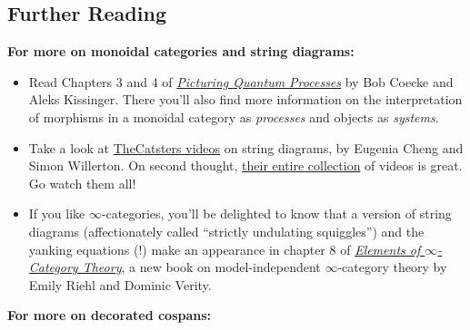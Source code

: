 \documentclass{tufte-handout-tai}
\theoremstyle{plain}
\theoremstyle{definition}
\theoremstyle{remark}
\begin{document}
\subsection{Further Reading}
\textbf{For more on monoidal categories and string diagrams:}
\begin{itemize}
	\item Read Chapters 3 and 4 of \href{https://www.amazon.com/Picturing-Quantum-Processes-Diagrammatic-Reasoning/dp/110710422X}{\textit{Picturing Quantum Processes}} by Bob Coecke and Aleks Kissinger. There you'll also find more information on the interpretation of morphisms in a monoidal category as \textit{processes} and objects as \textit{systems}.
	\item Take a look at \href{https://www.youtube.com/watch?v=USYRDDZ9yEc&list=PL50ABC4792BD0A086}{TheCatsters videos} on string diagrams, by Eugenia Cheng and Simon Willerton. On second thought, \href{http://www.simonwillerton.staff.shef.ac.uk/TheCatsters/}{their entire collection} of videos is great. Go watch them all!
	\item If you like $\infty$-categories, you'll be delighted to know that a version of string diagrams (affectionately called ``strictly undulating squiggles'') and the yanking equations (!) make an appearance in chapter 8 of \href{http://www.math.jhu.edu/~eriehl/ICWM.pdf}{\textit{Elements of $\infty$-Category Theory}}, a new book on model-independent $\infty$-category theory by Emily Riehl and Dominic Verity.
\end{itemize}
\textbf{For more on decorated cospans:}
\end{document}
